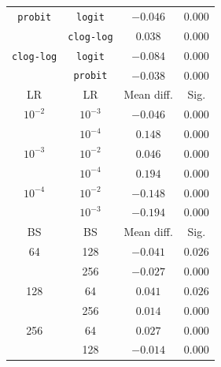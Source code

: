 \documentclass[journal]{IEEEtran}
\begin{document}
\begin{table}[!t]
\begin{tabular}{cccc}
			 \texttt{probit}  &  \texttt{logit}   &  $-0.046$  & $0.000$ \\
			                  & \texttt{clog-log} &  $0.038$   & $0.000$ \\
			\texttt{clog-log} &  \texttt{logit}   &  $-0.084$  & $0.000$ \\
			                  &  \texttt{probit}  &  $-0.038$  & $0.000$ \\ \hline\hline
			       LR         &        LR         & Mean diff. &  Sig.   \\ \hline
			    $10^{-2}$     &     $10^{-3}$     &  $-0.046$  & $0.000$ \\
			                  &     $10^{-4}$     &  $0.148$   & $0.000$ \\
			    $10^{-3}$     &     $10^{-2}$     &  $0.046$   & $0.000$ \\
			                  &     $10^{-4}$     &  $0.194$   & $0.000$ \\
			    $10^{-4}$     &     $10^{-2}$     &  $-0.148$  & $0.000$ \\
			                  &     $10^{-3}$     &  $-0.194$  & $0.000$ \\ \hline\hline
			       BS         &        BS         & Mean diff. &  Sig.   \\ \hline
			       64         &        128        &  $-0.041$  & $0.026$ \\
			                  &        256        &  $-0.027$  & $0.000$ \\
			       128        &        64         &  $0.041$   & $0.026$ \\
			                  &        256        &  $0.014$   & $0.000$ \\
			       256        &        64         &  $0.027$   & $0.000$ \\
			                  &        128        &  $-0.014$  & $0.000$ \\ \hline\hline
		\end{tabular}
	\end{table}
		
%	
	
\end{document}
